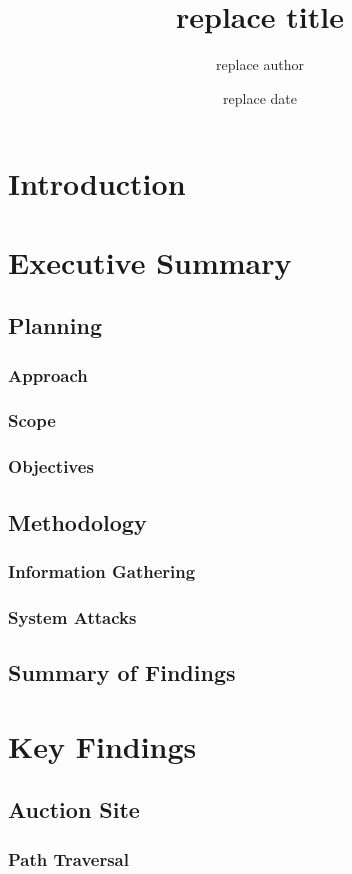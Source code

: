 \documentclass{report}
\title{replace title}
\author{replace author}
\date{replace date}
\begin{document}
\maketitle
\tableofcontents
\listoffigures

\chapter{Introduction}

\chapter{Executive Summary}
\section{Planning}
\subsection{Approach}
\subsection{Scope}
\subsection{Objectives}
\section{Methodology}
\subsection{Information Gathering}
\subsection{System Attacks}
\section{Summary of Findings}

\chapter{Key Findings}
\section{Auction Site}
\subsection{Path Traversal}
\end{document}
